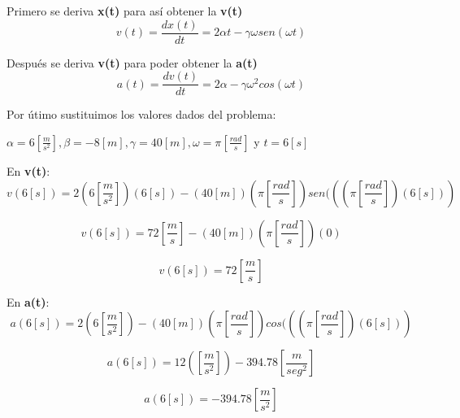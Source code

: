 \documentclass[a4paper,11pt]{scrartcl}
\begin{document}
\begin{center}

Primero se deriva {\bf x(t)} para así obtener la {\bf v(t)} \\

\begin{equation}
v(t) = \frac{d x(t)}{dt}  = 2\alpha t - \gamma \omega sen(\omega t)
\end{equation}

Después se deriva {\bf v(t)} para poder obtener la {\bf a(t)} \\

\begin{equation}
a(t) = \frac{d v(t)}{dt} = 2\alpha - \gamma \omega^{2}cos(\omega t)
\end{equation}

Por útimo sustituimos los valores dados del problema:

\hfill \break

$\alpha = 6 [\frac{m}{s^{2}}], \beta = -8 [m], \gamma = 40 [m], \omega = \pi [\frac{rad}{s}]$ y $t = 6 [s]$

\hfill \break

\hfill \break

En {\bf v(t)}:\\

\begin{equation}
v(6[s]) = 2(6[\frac{m}{s^{2}}])(6[s]) - (40[m])(\pi [\frac{rad}{s}])sen(((\pi [\frac{rad}{s}])(6[s]))
\end{equation}

\begin{equation}
v(6[s]) = 72[\frac{m}{s}] - (40[m])(\pi [ \frac{rad}{s}])(0)
\end{equation}

\begin{equation}
v(6[s]) = 72[\frac{m}{s}]
\end{equation}

En {\bf a(t)}:\\

\begin{equation}
a(6[s]) = 2(6[\frac{m}{s^{2}}]) - (40[m])(\pi [\frac{rad}{s}])cos(((\pi [\frac{rad}{s}])(6[s]))
\end{equation}

\begin{equation}
a(6[s]) = 12([\frac{m}{s^{2}}]) - 394.78 [\frac{m}{seg^{2}}]
\end{equation}

\begin{equation}
a(6[s]) = - 394.78 [\frac{m}{s^{2}}]
\end{equation}


\end{center}
\end{document}
